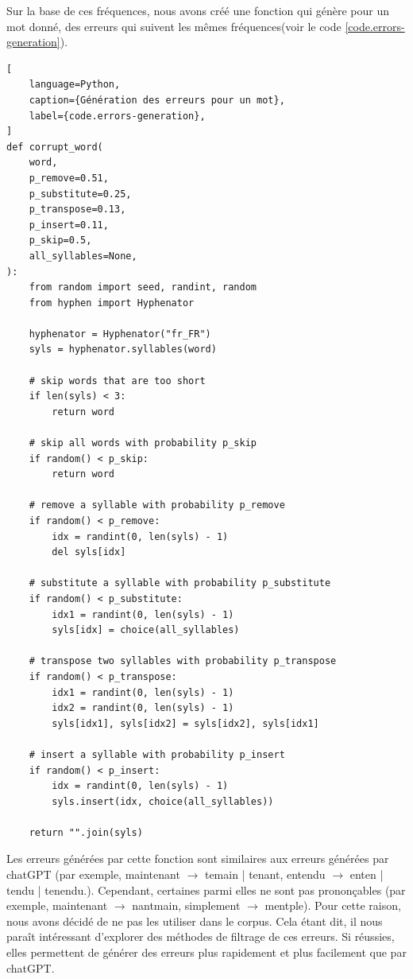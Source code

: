 Sur la base de ces fréquences, nous avons créé une fonction qui génère pour un mot donné,
des erreurs qui suivent les mêmes fréquences(voir le code \ref{code.errors-generation}).
\begin{lstlisting}[
    language=Python,
    caption={Génération des erreurs pour un mot},
    label={code.errors-generation},
]
def corrupt_word(
    word,
    p_remove=0.51,
    p_substitute=0.25,
    p_transpose=0.13,
    p_insert=0.11,
    p_skip=0.5,
    all_syllables=None,
):
    from random import seed, randint, random
    from hyphen import Hyphenator

    hyphenator = Hyphenator("fr_FR")
    syls = hyphenator.syllables(word)

    # skip words that are too short
    if len(syls) < 3:
        return word

    # skip all words with probability p_skip
    if random() < p_skip:
        return word

    # remove a syllable with probability p_remove
    if random() < p_remove:
        idx = randint(0, len(syls) - 1)
        del syls[idx]

    # substitute a syllable with probability p_substitute
    if random() < p_substitute:
        idx1 = randint(0, len(syls) - 1)
        syls[idx] = choice(all_syllables)

    # transpose two syllables with probability p_transpose
    if random() < p_transpose:
        idx1 = randint(0, len(syls) - 1)
        idx2 = randint(0, len(syls) - 1)
        syls[idx1], syls[idx2] = syls[idx2], syls[idx1]

    # insert a syllable with probability p_insert
    if random() < p_insert:
        idx = randint(0, len(syls) - 1)
        syls.insert(idx, choice(all_syllables))

    return "".join(syls)
\end{lstlisting}

Les erreurs générées par cette fonction sont similaires aux erreurs générées par chatGPT
(par exemple, maintenant \(\to\) temain | tenant, entendu \(\to\) enten | tendu | tenendu.).
Cependant, certaines parmi elles ne sont pas prononçables
(par exemple, maintenant \(\to\) nantmain, simplement \(\to\) mentple).
Pour cette raison, nous avons décidé de ne pas les utiliser dans le corpus.
Cela étant dit, il nous paraît intéressant d'explorer des méthodes de filtrage de ces erreurs.
Si réussies, elles permettent de générer des erreurs plus rapidement et plus facilement que par chatGPT.